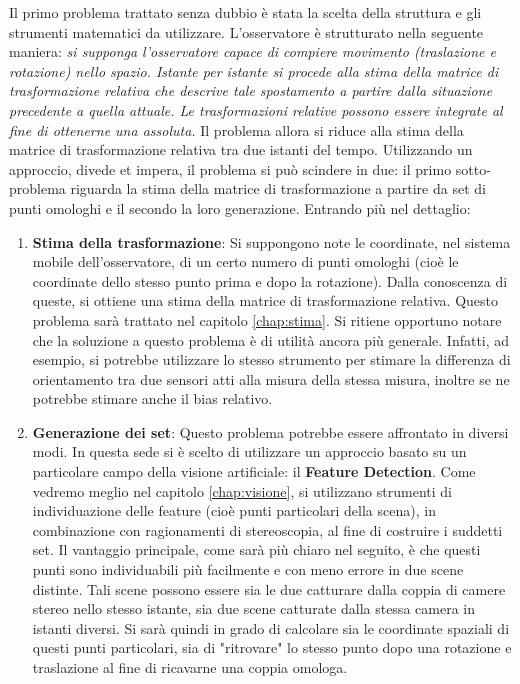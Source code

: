 Il primo problema trattato senza dubbio è stata la scelta della struttura e gli strumenti matematici da utilizzare. L'osservatore è strutturato nella seguente maniera: \textit{si supponga l'osservatore capace di compiere movimento (traslazione e rotazione) nello spazio. Istante per istante si procede alla stima della matrice di trasformazione relativa che descrive tale spostamento a partire dalla situazione precedente a quella attuale. Le trasformazioni relative possono essere integrate al fine di ottenerne una assoluta.} 
Il problema allora si riduce alla stima della matrice di trasformazione relativa tra due istanti del tempo. Utilizzando un approccio, divede et impera, il problema si può scindere in due: il primo sotto-problema riguarda la stima della matrice di trasformazione a partire da set di punti omologhi e il secondo la loro generazione. Entrando più nel dettaglio:
\begin{enumerate}
	\item \textbf{Stima della trasformazione}: Si suppongono note le coordinate, nel sistema mobile dell'osservatore, di un certo numero di punti omologhi (cioè le coordinate dello stesso punto prima e dopo la rotazione). Dalla conoscenza di queste, si ottiene una stima della matrice di trasformazione relativa. Questo problema sarà trattato nel capitolo \ref{chap:stima}. Si ritiene opportuno notare che la soluzione a questo problema è di utilità ancora più generale. Infatti, ad esempio, si potrebbe utilizzare lo stesso strumento per stimare la differenza di orientamento tra due sensori atti alla misura della stessa misura, inoltre se ne potrebbe stimare anche il bias relativo.
	
	\item \textbf{Generazione dei set}: Questo problema potrebbe essere affrontato in diversi modi. In questa sede si è scelto di utilizzare un approccio basato su un particolare campo della visione artificiale: il \textbf{Feature Detection}. Come vedremo meglio nel capitolo \ref{chap:visione}, si utilizzano strumenti di individuazione delle feature (cioè punti particolari della scena), in combinazione con ragionamenti di stereoscopia, al fine di costruire i suddetti set. Il vantaggio principale, come sarà più chiaro nel seguito, è che questi punti sono individuabili più facilmente e con meno errore in due scene distinte. Tali scene possono essere sia le due catturare dalla coppia di camere stereo nello stesso istante, sia due scene catturate dalla stessa camera in istanti diversi. Si sarà quindi in grado di calcolare sia le coordinate spaziali di questi punti particolari, sia di "ritrovare" lo stesso punto dopo una rotazione e traslazione al fine di ricavarne una coppia omologa.
\end{enumerate}





